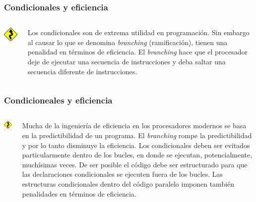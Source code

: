\documentclass{beamer}
\begin{document}
\begin{frame}[fragile]
    \frametitle{Condicionales y eficiencia}

\begin{columns}
    \begin{column}{0.3\textwidth}
        \includegraphics[width=3cm]{figuras/sin.png}
    \end{column}
    \begin{column}{0.7\textwidth}
        Los condicionales son de extrema utilidad en programación. Sin embargo al causar lo que se denomina {\em branching} (ramificación), tienen una penalidad
        en términos de eficiencia. El {\em branching} hace que el procesador deje de ejecutar una secuencia de instrucciones y deba saltar una secuencia
        diferente de instrucciones. 
    \end{column}

\end{columns}
 \end{frame}


\begin{frame}[fragile]
    \frametitle{Condicioneales y eficiencia}

\begin{columns}
    \begin{column}{0.3\textwidth}
        \includegraphics[width=3cm]{figuras/sin.png}
    \end{column}
    \begin{column}{0.7\textwidth}
        Mucha de la ingeniería de eficiencia en los procesadores modernos se basa en la predictibilidad de un programa. El {\em branching}
        rompe la predictibilidad y por lo tanto disminuye la eficiencia. Los condicionales deben ser evitados particularmente dentro de los bucles,
        en donde se ejecutan, potencialmente, muchísimas veces. De ser posible el código debe ser estructurado para que las declaraciones condicionales
        se ejecuten fuera de los bucles. Las estructuras condicionales dentro del código paralelo imponen también penalidades en términos de eficiencia.
    \end{column}

\end{columns}
 \end{frame}
\end{document}

